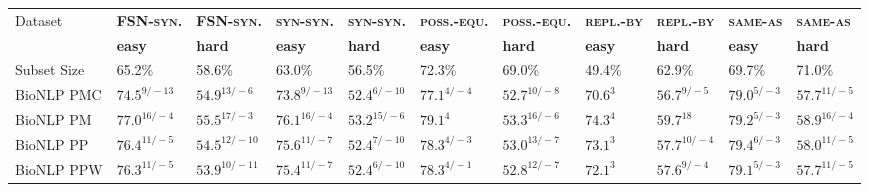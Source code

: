\documentclass[letterpaper]{article} %
\newcommand{\dataset}[1]{\textsc{#1}}
\begin{document}
\begin{table*}[ht]
    \centering
\scriptsize
     \begin{tabular}{l l l l l l l l l l l}
\multirow{2}{*}{Dataset}& \textbf{\dataset{FSN-syn.}} & \textbf{\dataset{FSN-syn.}} & \textbf{\dataset{syn-syn.}} & \textbf{\dataset{syn-syn.}} & \textbf{\dataset{poss.-equ.}} & \textbf{\dataset{poss.-equ.}} & \textbf{\dataset{repl.-by}} & \textbf{\dataset{repl.-by}} & \textbf{\dataset{same-as}} & \textbf{\dataset{same-as}} \\
& \textbf{easy} & \textbf{hard} & \textbf{easy} & \textbf{hard} & \textbf{easy} & \textbf{hard} & \textbf{easy} & \textbf{hard} & \textbf{easy} & \textbf{hard} \\
Subset Size & 65.2\% & 58.6\% & 63.0\% & 56.5\% & 72.3\% & 69.0\% & 49.4\% & 62.9\% & 69.7\% & 71.0\% \\
\midrule
BioNLP PMC & $74.5^{9/-13}$ & $54.9^{13/-6}$ & $73.8^{9/-13}$ & $52.4^{6/-10}$ & $77.1^{4/-4}$ & $52.7^{10/-8}$ & $70.6^{3}$ & $56.7^{9/-5}$ & $79.0^{5/-3}$ & $57.7^{11/-5}$ \\
BioNLP PM & $77.0^{16/-4}$ & $55.5^{17/-3}$ & $76.1^{16/-4}$ & $53.2^{15/-6}$ & $79.1^{4}$ & $53.3^{16/-6}$ & $74.3^{4}$ & $59.7^{18}$ & $79.2^{5/-3}$ & $58.9^{16/-4}$ \\
BioNLP PP & $76.4^{11/-5}$ & $54.5^{12/-10}$ & $75.6^{11/-7}$ & $52.4^{7/-10}$ & $78.3^{4/-3}$ & $53.0^{13/-7}$ & $73.1^{3}$ & $57.7^{10/-4}$ & $79.4^{6/-3}$ & $58.0^{11/-5}$ \\
BioNLP PPW & $76.3^{11/-5}$ & $53.9^{10/-11}$ & $75.4^{11/-7}$ & $52.4^{6/-10}$ & $78.3^{4/-1}$ & $52.8^{12/-7}$ & $72.1^{3}$ & $57.6^{9/-4}$ & $79.1^{5/-3}$ & $57.7^{11/-5}$ \\

\end{tabular}
\end{table*}
\end{document}
